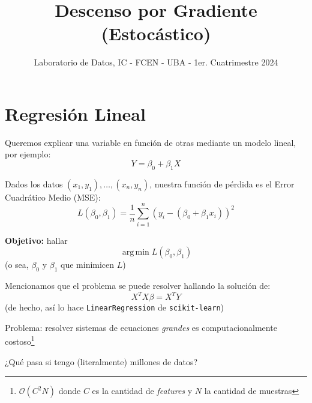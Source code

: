 \documentclass[aspectratio=169, usenames,dvipsnames]{beamer}
\title{Descenso por Gradiente (Estoc\'astico)}
\subtitle{Laboratorio de Datos, IC - FCEN - UBA - 1er. Cuatrimestre 2024}
\author{}
\DeclareMathOperator*{\argmin}{arg\,min}
\begin{document}
  \frame[c]{\maketitle}




\section{Regresi\'on Lineal}

\begin{frame}
    Queremos explicar una variable en funci\'on de otras mediante un modelo lineal, por ejemplo:
    \[Y = \beta_0 + \beta_1 X\]
    \pause
    
    Dados los datos $(x_1, y_1), \dots, (x_n, y_n)$, nuestra función de pérdida es el Error Cuadrático Medio (MSE):
    \[L(\beta_0, \beta_1) = \dfrac{1}{n}\sum_{i=1}^n (y_i - (\beta_0 + \beta_1x_i))^2\]

    \pause
    \textbf{Objetivo:} hallar
    \[\argmin L(\beta_0, \beta_1)\]
    (o sea, $\beta_0$ y $\beta_1$ que minimicen $L$)

\end{frame}

\begin{frame}
    Mencionamos que el problema se puede resolver hallando la solución de:
    \[X^TX\beta = X^TY\]
    (de hecho, así lo hace \texttt{LinearRegression} de \texttt{scikit-learn})
    \pause

    \vspace{0.5cm}
    \alert{Problema:} resolver sistemas de ecuaciones \textit{grandes} es computacionalmente costoso\footnote[frame]{$\mathcal{O}(C^2N)$ donde $C$ es la cantidad de \textit{features} y $N$ la cantidad de muestras}

    \vspace{0.5cm}
    ¿Qué pasa si tengo (literalmente) millones de datos?
    
\end{frame}
\end{document}
